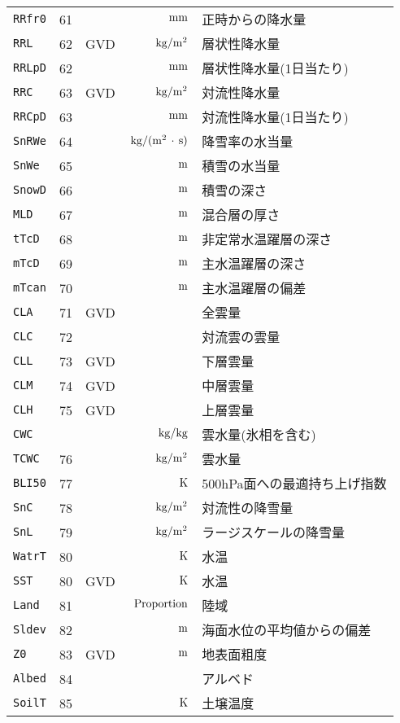 \begin{longtable}{l|rrrp{}}
{\tt RRfr0} & 61 &  & ${\rm\,mm}$ & 正時からの降水量 \\
{\tt RRL} & 62 & GVD & ${\rm\,kg/m^2}$ & 層状性降水量 \\
{\tt RRLpD} & 62 &  & ${\rm\,mm}$ & 層状性降水量(1日当たり) \\
{\tt RRC} & 63 & GVD & ${\rm\,kg/m^2}$ & 対流性降水量 \\
{\tt RRCpD} & 63 &  & ${\rm\,mm}$ & 対流性降水量(1日当たり) \\
{\tt SnRWe} & 64 &  & ${\rm\,kg/(m^2\,\cdot\,s)}$ & 降雪率の水当量 \\
{\tt SnWe} & 65 &  & ${\rm\,m}$ & 積雪の水当量 \\
{\tt SnowD} & 66 &  & ${\rm\,m}$ & 積雪の深さ \\
{\tt MLD} & 67 &  & ${\rm\,m}$ & 混合層の厚さ \\
{\tt tTcD} & 68 &  & ${\rm\,m}$ & 非定常水温躍層の深さ \\
{\tt mTcD} & 69 &  & ${\rm\,m}$ & 主水温躍層の深さ \\
{\tt mTcan} & 70 &  & ${\rm\,m}$ & 主水温躍層の偏差 \\
{\tt CLA} & 71 & GVD &  & 全雲量 \\
{\tt CLC} & 72 &  &  & 対流雲の雲量 \\
{\tt CLL} & 73 & GVD &  & 下層雲量 \\
{\tt CLM} & 74 & GVD &  & 中層雲量 \\
{\tt CLH} & 75 & GVD &  & 上層雲量 \\
{\tt CWC} &  &  & ${\rm\,kg/kg}$ & 雲水量(氷相を含む) \\
{\tt TCWC} & 76 &  & ${\rm\,kg/m^2}$ & 雲水量 \\
{\tt BLI50} & 77 &  & ${\rm\,K}$ & 500hPa面への最適持ち上げ指数 \\
{\tt SnC} & 78 &  & ${\rm\,kg/m^2}$ & 対流性の降雪量 \\
{\tt SnL} & 79 &  & ${\rm\,kg/m^2}$ & ラージスケールの降雪量 \\
{\tt WatrT} & 80 &  & ${\rm\,K}$ & 水温 \\
{\tt SST} & 80 & GVD & ${\rm\,K}$ & 水温 \\
{\tt Land} & 81 &  & ${\rm\,Proportion}$ & 陸域 \\
{\tt Sldev} & 82 &  & ${\rm\,m}$ & 海面水位の平均値からの偏差 \\
{\tt Z0} & 83 & GVD & ${\rm\,m}$ & 地表面粗度 \\
{\tt Albed} & 84 &  &  & アルベド \\
{\tt SoilT} & 85 &  & ${\rm\,K}$ & 土壌温度 \\

\end{longtable}
